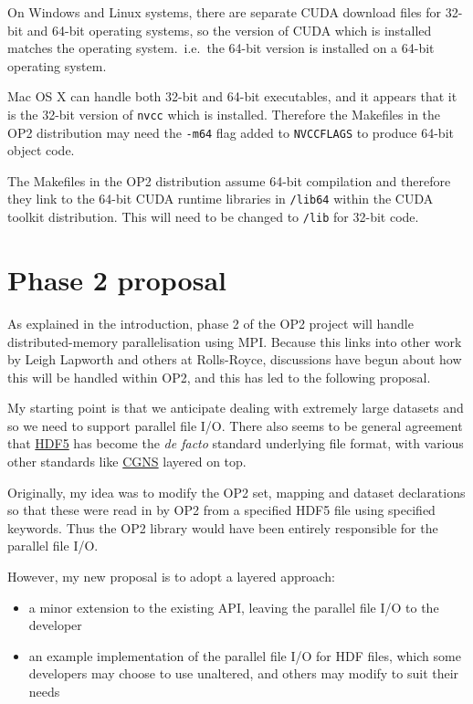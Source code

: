 \documentclass[11pt]{article}
\begin{document}
On Windows and Linux systems, there are separate CUDA download files
for 32-bit and 64-bit operating systems, so the version of CUDA which 
is installed matches the operating system.~i.e.~the 64-bit version is 
installed on a 64-bit operating system.

Mac OS X can handle both 32-bit and 64-bit executables, and it appears
that it is the 32-bit version of {\tt nvcc} which is installed.  Therefore
the Makefiles in the OP2 distribution may need the {\tt -m64} flag
added to {\tt NVCCFLAGS} to produce 64-bit object code.

The Makefiles in the OP2 distribution assume 64-bit compilation and 
therefore they link to the 64-bit CUDA runtime libraries in {\tt /lib64} 
within the CUDA toolkit distribution.  This will need to be changed to 
{\tt /lib} for 32-bit code.


\section{Phase 2 proposal}

As explained in the introduction, phase 2 of the OP2 project will handle 
distributed-memory parallelisation using MPI.  Because this links into other
work by Leigh Lapworth and others at Rolls-Royce, discussions have
begun about how this will be handled within OP2, and this has led to the 
following proposal.

My starting point is that we anticipate dealing with extremely large datasets
and so we need to support parallel file I/O.  There also seems to be
general agreement that 
\href{http://www.hdfgroup.org/HDF5/}{HDF5}
has become the {\it de facto} standard underlying file format, 
with various other standards like
\href{http://cgns.sourceforge.net/hdf5.html}{CGNS}
layered on top.

Originally, my idea was to modify the OP2 set, mapping and dataset declarations
so that these were read in by OP2 from a specified HDF5 file using specified 
keywords.  Thus the OP2 library would have been entirely responsible for the 
parallel file I/O.

However, my new proposal is to adopt a layered approach:
\begin{itemize}
\item
a minor extension to the existing API, leaving the parallel file I/O to the 
developer

\item
an example implementation of the parallel file I/O for HDF files, which some
developers may choose to use unaltered, and others may modify to suit their needs
\end{itemize}
\end{document}
